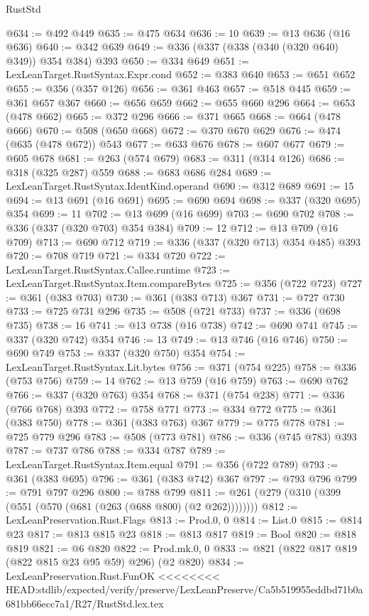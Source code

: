 \begin{lexlean}{RustStd}
\begin{coremodule}
{\begin{coremodule}
{{{{{{{{{@634 := @492 @449
@635 := @475 @634
@636 := 10
@639 := @13 @636 (@16 @636)
@640 := @342 @639
@649 := @336 (@337 (@338 (@340 (@320 @640) @349)) @354 @384) @393
@650 := @334 @649
@651 := LexLeanTarget.RustSyntax.Expr.cond
@652 := @383 @640
@653 := @651 @652
@655 := @356 (@357 @126)
@656 := @361 @463
@657 := @518 @445
@659 := @361 @657 @367
@660 := @656 @659
@662 := @655 @660 @296
@664 := @653 (@478 @662)
@665 := @372 @296
@666 := @371 @665
@668 := @664 (@478 @666)
@670 := @508 (@650 @668)
@672 := @370 @670 @629
@676 := @474 (@635 (@478 @672)) @543
@677 := @633 @676
@678 := @607 @677
@679 := @605 @678
@681 := @263 (@574 @679)
@683 := @311 (@314 @126)
@686 := @318 (@325 @287) @559
@688 := @683 @686 @284
@689 := LexLeanTarget.RustSyntax.IdentKind.operand
@690 := @312 @689
@691 := 15
@694 := @13 @691 (@16 @691)
@695 := @690 @694
@698 := @337 (@320 @695) @354
@699 := 11
@702 := @13 @699 (@16 @699)
@703 := @690 @702
@708 := @336 (@337 (@320 @703) @354 @384)
@709 := 12
@712 := @13 @709 (@16 @709)
@713 := @690 @712
@719 := @336 (@337 (@320 @713) @354 @485) @393
@720 := @708 @719
@721 := @334 @720
@722 := LexLeanTarget.RustSyntax.Callee.runtime
@723 := LexLeanTarget.RustSyntax.Item.compareBytes
@725 := @356 (@722 @723)
@727 := @361 (@383 @703)
@730 := @361 (@383 @713) @367
@731 := @727 @730
@733 := @725 @731 @296
@735 := @508 (@721 @733)
@737 := @336 (@698 @735)
@738 := 16
@741 := @13 @738 (@16 @738)
@742 := @690 @741
@745 := @337 (@320 @742) @354
@746 := 13
@749 := @13 @746 (@16 @746)
@750 := @690 @749
@753 := @337 (@320 @750) @354
@754 := LexLeanTarget.RustSyntax.Lit.bytes
@756 := @371 (@754 @225)
@758 := @336 (@753 @756)
@759 := 14
@762 := @13 @759 (@16 @759)
@763 := @690 @762
@766 := @337 (@320 @763) @354
@768 := @371 (@754 @238)
@771 := @336 (@766 @768) @393
@772 := @758 @771
@773 := @334 @772
@775 := @361 (@383 @750)
@778 := @361 (@383 @763) @367
@779 := @775 @778
@781 := @725 @779 @296
@783 := @508 (@773 @781)
@786 := @336 (@745 @783) @393
@787 := @737 @786
@788 := @334 @787
@789 := LexLeanTarget.RustSyntax.Item.equal
@791 := @356 (@722 @789)
@793 := @361 (@383 @695)
@796 := @361 (@383 @742) @367
@797 := @793 @796
@799 := @791 @797 @296
@800 := @788 @799
@811 := @261 (@279 (@310 (@399 (@551 (@570 (@681 (@263 (@688 @800) (@2 @262))))))))
@812 := LexLeanPreservation.Rust.Flags
@813 := Prod.{0, 0}
@814 := List.{0}
@815 := @814 @23
@817 := @813 @815 @23
@818 := @813 @817
@819 := Bool
@820 := @818 @819
@821 := @6 @820
@822 := Prod.mk.{0, 0}
@833 := @821 (@822 @817 @819 (@822 @815 @23 @95 @59) @296) (@2 @820)
@834 := LexLeanPreservation.Rust.FunOK
<<<<<<<< HEAD:stdlib/expected/verify/preserve/LexLeanPreserve/Ca5b519955eddbd71b0a681bb66ecc7a1/R27/RustStd.lex.tex
}}}}}}}}}
\end{coremodule}}
\end{coremodule}
\end{lexlean}
